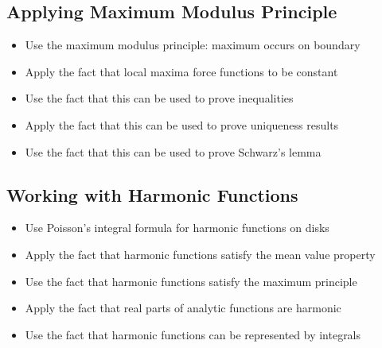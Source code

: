 \subsection*{Applying Maximum Modulus Principle}
\begin{itemize}
\item Use the maximum modulus principle: maximum occurs on boundary
\item Apply the fact that local maxima force functions to be constant
\item Use the fact that this can be used to prove inequalities
\item Apply the fact that this can be used to prove uniqueness results
\item Use the fact that this can be used to prove Schwarz's lemma
\end{itemize}

\subsection*{Working with Harmonic Functions}
\begin{itemize}
\item Use Poisson's integral formula for harmonic functions on disks
\item Apply the fact that harmonic functions satisfy the mean value property
\item Use the fact that harmonic functions satisfy the maximum principle
\item Apply the fact that real parts of analytic functions are harmonic
\item Use the fact that harmonic functions can be represented by integrals
\end{itemize}
